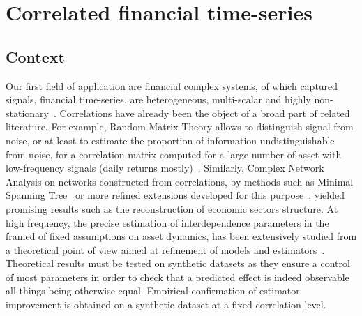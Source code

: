 \documentclass{article}
\begin{document}


\section*{Correlated financial time-series}


\subsection*{Context}

Our first field of application are financial complex systems, of which captured signals, financial time-series, are heterogeneous, multi-scalar and highly non-stationary~\cite{mantegna2000introduction}. Correlations have already been the object of a broad part of related literature. For example, Random Matrix Theory allows to distinguish signal from noise, or at least to estimate the proportion of information undistinguishable from noise, for a correlation matrix computed for a large number of asset with low-frequency signals (daily returns mostly)~\cite{2009arXiv0910.1205B}. Similarly, Complex Network Analysis on networks constructed from correlations, by methods such as Minimal Spanning Tree~\cite{2001PhyA..299...16B} or more refined extensions developed for this purpose~\cite{tumminello2005tool}, yielded promising results such as the reconstruction of economic sectors structure. At high frequency, the precise estimation of interdependence parameters in the framed of fixed assumptions on asset dynamics, has been extensively studied from a theoretical point of view aimed at refinement of models and estimators~\cite{barndorff2011multivariate}. Theoretical results must be tested on synthetic datasets as they ensure a control of most parameters in order to check that a predicted effect is indeed observable all things being otherwise equal. Empirical confirmation of estimator improvement is obtained on a synthetic dataset at a fixed correlation level.
\end{document}
